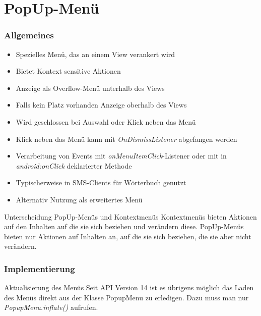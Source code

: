 \section{PopUp-Menü}
\begin{frame}
   \frametitle{Allgemeines}
   \begin{itemize}
      \item Spezielles Menü, das an einem View verankert wird
      \item Bietet Kontext sensitive Aktionen
      \item Anzeige als Overflow-Menü unterhalb des Views
      \item Falls kein Platz vorhanden Anzeige oberhalb des Views
      \item Wird geschlossen bei Auswahl oder Klick neben das Menü
      \item Klick neben das Menü kann mit \emph{OnDismissListener} abgefangen werden
      \item Verarbeitung von Events mit \emph{onMenuItemClick}-Listener 
         oder mit in \emph{android:onClick} deklarierter Methode
      \item Typischerweise in SMS-Clients für Wörterbuch genutzt
      \item Alternativ Nutzung als erweitertes Menü
   \end{itemize}

   \begin{alertblock}{Unterscheidung PopUp-Menüs und Kontextmenüs}
      Kontextmenüs bieten Aktionen auf den Inhalten auf die sie sich beziehen und 
      verändern diese. PopUp-Menüs bieten nur Aktionen auf Inhalten an, auf die 
      sie sich beziehen, die sie aber nicht verändern.
   \end{alertblock}
\end{frame}

\begin{frame}
   \frametitle{Implementierung}

   

   

   \begin{alertblock}{Aktualisierung des Menüs}
      Seit API Version 14 ist es übrigens möglich das Laden des Menüs direkt aus der 
      Klasse PopupMenu zu erledigen. Dazu muss man nur \emph{PopupMenu.inflate()} aufrufen.
   \end{alertblock}
\end{frame}

